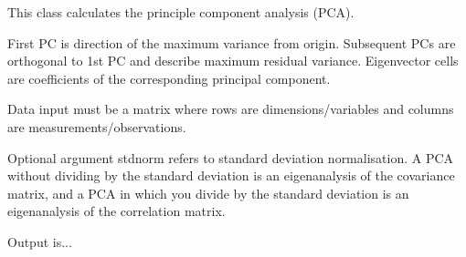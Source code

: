 \documentclass[letterpaper,10pt,english]{sphinxmanual}
\begin{document}
\begin{fulllineitems}
\label{SamPy.pca:SamPy.pca.SMNpca.SMNpca}
This class calculates the principle component analysis (PCA).

First PC is direction of the maximum variance from origin. Subsequent PCs are orthogonal
to 1st PC and describe maximum residual variance. Eigenvector cells are coefficients of 
the corresponding principal component.

Data input must be a matrix where rows are dimensions/variables and columns
are measurements/observations.

Optional argument stdnorm refers to standard deviation normalisation.
A PCA without dividing by the standard deviation is an eigenanalysis of the covariance matrix, 
and a PCA in which you divide by the standard deviation is an eigenanalysis of the correlation matrix.

Output is...


\begin{fulllineitems}
\label{SamPy.pca:SamPy.pca.SMNpca.SMNpca.Cov}
\end{fulllineitems}



\begin{fulllineitems}
\label{SamPy.pca:SamPy.pca.SMNpca.SMNpca.DisplayAxisVariation}
\end{fulllineitems}



\begin{fulllineitems}
\label{SamPy.pca:SamPy.pca.SMNpca.SMNpca.DisplayCov}
\end{fulllineitems}



\begin{fulllineitems}
\label{SamPy.pca:SamPy.pca.SMNpca.SMNpca.DisplayEigenvalues}
\end{fulllineitems}



\end{fulllineitems}
\end{document}
